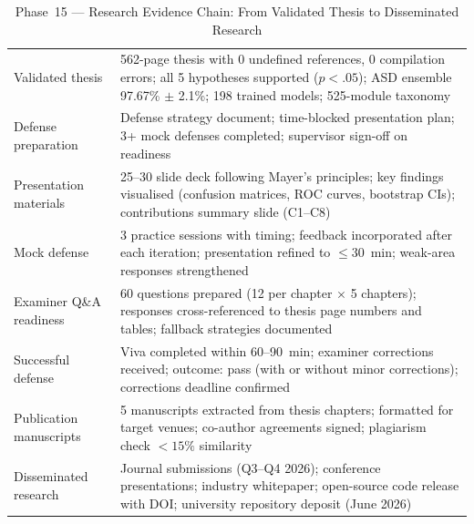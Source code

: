 \begingroup\singlespacing\tablefontsize\tablestripes
\begin{xltabular}{\textwidth}{@{} l X @{}}
\caption[Phase~15 --- Research Evidence Chain: From Validated]{Phase~15 --- Research Evidence Chain: From Validated Thesis to Disseminated Research}
\label{tab:phase15_evidence}\\
\toprule
{} &  \\
\midrule
\endfirsthead
\endhead
\bottomrule
\endlastfoot
Validated thesis                & 562-page thesis with 0 undefined references, 0 compilation errors; all 5 hypotheses supported ($p < .05$); ASD ensemble 97.67\% $\pm$ 2.1\%; 198 trained models; 525-module taxonomy \\
\addlinespace
Defense preparation             & Defense strategy document; time-blocked presentation plan; 3+ mock defenses completed; supervisor sign-off on readiness \\
\addlinespace
Presentation materials          & 25--30 slide deck following Mayer's principles; key findings visualised (confusion matrices, ROC curves, bootstrap CIs); contributions summary slide (C1--C8) \\
\addlinespace
Mock defense                    & 3 practice sessions with timing; feedback incorporated after each iteration; presentation refined to $\leq$30~min; weak-area responses strengthened \\
\addlinespace
Examiner Q\&A readiness         & 60 questions prepared (12 per chapter $\times$ 5 chapters); responses cross-referenced to thesis page numbers and tables; fallback strategies documented \\
\addlinespace
Successful defense              & Viva completed within 60--90~min; examiner corrections received; outcome: pass (with or without minor corrections); corrections deadline confirmed \\
\addlinespace
Publication manuscripts         & 5 manuscripts extracted from thesis chapters; formatted for target venues; co-author agreements signed; plagiarism check $< 15\%$ similarity \\
\addlinespace
Disseminated research           & Journal submissions (Q3--Q4 2026); conference presentations; industry whitepaper; open-source code release with DOI; university repository deposit (June 2026) \\
\end{xltabular}
\endgroup

\vspace{1.5em}

